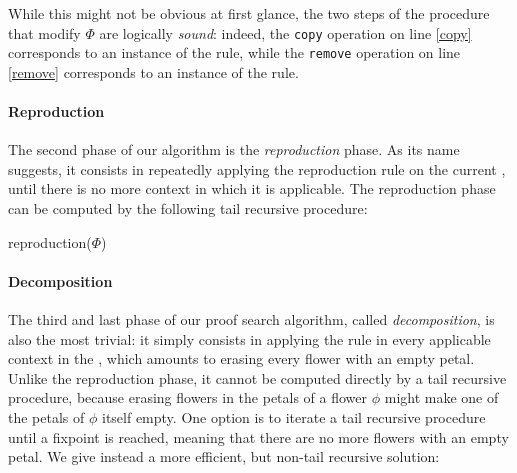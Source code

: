 While this might not be obvious at first glance, the two steps of the
 procedure that modify $\Phi$ are logically
\emph{sound}: indeed, the \texttt{copy} operation on line \ref{copy} corresponds
to an instance of the  rule, while the \texttt{remove} operation
on line \ref{remove} corresponds to an instance of the  rule.

\paragraph{Reproduction}

The second phase of our algorithm is the \emph{reproduction} phase. As its name
suggests, it consists in repeatedly applying the reproduction rule  on
the current , until there is no more context in which it is
applicable. The reproduction phase can be computed by the following tail
recursive procedure:

\begin{procedure}[H]
  \caption{reproduction($\Phi$)}
  \BlankLine

\end{procedure}

\paragraph{Decomposition}

The third and last phase of our proof search algorithm, called
\emph{decomposition}, is also the most trivial: it simply consists in applying
the  rule in every applicable context in the , which amounts to
erasing every flower with an empty petal. Unlike the reproduction phase, it cannot be
computed directly by a tail recursive procedure, because erasing flowers in the
petals of a flower $\phi$ might make one of the petals of $\phi$ itself empty.
One option is to iterate a tail recursive procedure until a fixpoint is reached,
meaning that there are no more flowers with an empty petal. We give instead a
more efficient, but non-tail recursive solution:

